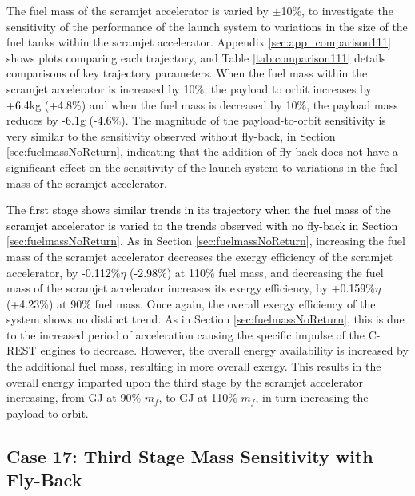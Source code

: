 The fuel mass of the scramjet accelerator is varied by $\pm$10\%, to investigate the sensitivity of the performance of the launch system to variations in the size of the fuel tanks within the scramjet accelerator. 
Appendix \ref{sec:app_comparison111} shows plots comparing each trajectory, and Table \ref{tab:comparison111} details comparisons of key trajectory parameters. 
When the fuel mass within the scramjet accelerator is increased by 10\%, the payload to orbit increases by \textcolor{black}{+6.4}kg (\textcolor{black}{+4.8}\%) and when the fuel mass is decreased by 10\%, the payload mass reduces by \textcolor{black}{-6.1}g (\textcolor{black}{-4.6}\%). The magnitude of the payload-to-orbit sensitivity is very similar to the sensitivity observed without fly-back, in Section \ref{sec:fuelmassNoReturn}, indicating that the addition of fly-back does not have a significant effect on the sensitivity of the launch system to variations in the fuel mass of the scramjet accelerator. 


\textcolor{black}{
The first stage shows similar trends in its trajectory when the fuel mass of the scramjet accelerator is varied to the trends observed with no fly-back in Section \ref{sec:fuelmassNoReturn}.}
As in Section \ref{sec:fuelmassNoReturn}, increasing the fuel mass of the scramjet accelerator decreases the exergy efficiency of the scramjet accelerator, by \textcolor{black}{-0.112}\%$\eta$ (\textcolor{black}{-2.98}\%) at 110\% fuel mass, and decreasing the fuel mass of the scramjet accelerator increases its exergy efficiency, by \textcolor{black}{+0.159}\%$\eta$ (\textcolor{black}{+4.23}\%) at 90\% fuel mass. Once again, the overall exergy efficiency of the system shows no distinct trend. 
As in Section \ref{sec:fuelmassNoReturn}, this is due to the increased period of acceleration causing the specific impulse of the C-REST engines to decrease. However, the overall energy availability is increased by the additional fuel mass, resulting in more overall exergy. This results in the overall energy imparted upon the third stage by the scramjet accelerator increasing, from \secondExergythirdStagemFuelNinety GJ at 90\% $m_{f}$, to \secondExergythirdStagemFuelOneHundredTen GJ at 110\% $m_{f}$, in turn increasing the payload-to-orbit.




\subsection{Case 17: Third Stage Mass Sensitivity with Fly-Back}

